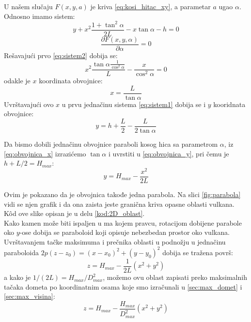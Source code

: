 \documentclass[a4paper]{article}
\begin{document}
U našem slučaju $F(x,y,a)$ je kriva \ref{eq:kosi_hitac_xy}, a parametar $a$ ugao $\alpha$.
Odnosno imamo sistem:
\begin{equation}
\label{eq:sistem1}
y + x^2\frac{1+\tan^2 \alpha}{2L} - x \tan \alpha - h = 0
\end{equation}
\begin{equation}
\label{eq:sistem2}
\frac{\partial F(x,y,\alpha)}{\partial \alpha} = 0
\end{equation}
Rešavajući prvo \ref{eq:sistem2} dobija se:
$$ x^2\frac{\tan \alpha\frac{1}{\cos^2 \alpha}}{L} - \frac{x}{\cos^2 \alpha} = 0 $$
odakle je $x$ koordinata obvojnice:
\begin{equation}
\label{eq:obvojnica_x}
x = \frac{L}{\tan \alpha}
\end{equation}
Uvrštavajući ovo $x$ u prvu jednačinu sistema \ref{eq:sistem1} dobija se i $y$ kooridnata
obvojnice:
\begin{equation}
\label{eq:obvojnica_y}
y = h + \frac{L}{2} - \frac{L}{2 \tan \alpha}
\end{equation}

Da bismo dobili jednačinu obvojnice paraboli kosog hica sa parametrom $\alpha$, iz
\ref{eq:obvojnica_x} izrazićemo $\tan \alpha$ i uvrstiti u \ref{eq:obvojnica_y},
pri čemu je $h + L/2 = H_{max}$: 
\begin{equation}
\label{eq:obvojnica_kriva}
y = H_{max} - \frac{x^2}{2L}
\end{equation}

Ovim je pokazano da je obvojnica takođe jedna parabola. Na slici \ref{fig:parabola}
vidi se njen grafik i da ona zaista jeste granična kriva opasne oblasti vulkana.
K\^od ove slike opisan je u delu \ref{kod:2D_oblast}.\\


Kako kamen može biti ispaljen u ma kojem pravcu, rotacijom dobijene parabole oko
$y$-ose dobija se paraboloid koji opisuje nebezbedan prostor oko vulkana.
Uvrštavanjem tačke maksimuma i prečnika oblasti u podnožju u jednačinu paraboloida
$ 2p(z-z_0) = (x-x_0)^2 + (y-y_0)^2 $ dobija se tražena površ:
\begin{equation}
\label{eq:paraboloid1}
z = H_{max} - \frac{1}{2L} (x^2 + y^2)
\end{equation}
a kako je $1/(2L) = H_{max}/D^2_{max}$, možemo ovu oblast zapisati preko
maksimalnih tačaka dometa po koordinatnim osama koje smo izračunali u 
\ref{sec:max_domet} i \ref{sec:max_visina}:
\begin{equation}
\label{eq:paraboloid}
\boxed{z = H_{max} - \frac{H_{max}}{D^2_{max}} (x^2 + y^2)}
\end{equation}
\end{document}
